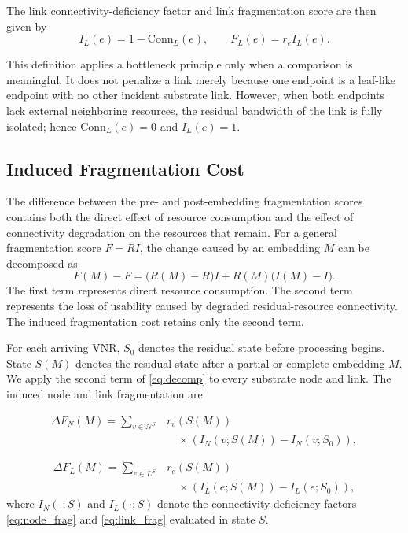 \documentclass{ieeeaccess}
\begin{document}
The link connectivity-deficiency factor and link fragmentation score are then given by
\begin{equation}
	I_L(e)=1-\mathrm{Conn}_L(e),
	\qquad
	F_L(e)=r_e I_L(e).
	\label{eq:link_frag}
\end{equation}

This definition applies a bottleneck principle only when a comparison is
meaningful. It does not penalize a link merely because one endpoint is a
leaf-like endpoint with no other incident substrate link. However, when
both endpoints lack external neighboring resources, the residual bandwidth
of the link is fully isolated; hence $\mathrm{Conn}_L(e)=0$ and
$I_L(e)=1$.

\subsection{Induced Fragmentation Cost}

The difference between the pre- and post-embedding fragmentation scores
contains both the direct effect of resource consumption and the effect of
connectivity degradation on the resources that remain. For a general
fragmentation score $F=RI$, the change caused by an embedding $M$ can be
decomposed as
\begin{equation}
	F(M)-F
	=
	\bigl(R(M)-R\bigr)I
	+
	R(M)\bigl(I(M)-I\bigr).
	\label{eq:decomp}
\end{equation}
The first term represents direct resource consumption. The second term represents the loss of
usability caused by degraded residual-resource connectivity. The induced fragmentation cost retains
only the second term.

For each arriving VNR, $S_0$ denotes the residual state before processing begins. State $S(M)$
denotes the residual state after a partial or complete embedding $M$. We apply the second term of
\eqref{eq:decomp} to every substrate node and link. The induced node and link fragmentation are

\begin{equation}
	\begin{aligned}
		\Delta F_N(M) = \sum_{v\in N^S} & r_v(S(M))                                             \\
		                                & \quad \times \left( I_N(v;S(M)) - I_N(v;S_0) \right), 
	\end{aligned}
	\label{eq:delta_fn}
\end{equation}

\begin{equation}
	\begin{aligned}
		\Delta F_L(M) = \sum_{e\in L^S} & r_e(S(M))                                             \\
		                                & \quad \times \left( I_L(e;S(M)) - I_L(e;S_0) \right), 
	\end{aligned}
	\label{eq:delta_fl}
\end{equation}
where $I_N(\cdot;S)$ and $I_L(\cdot;S)$ denote the connectivity-deficiency factors
\eqref{eq:node_frag} and \eqref{eq:link_frag} evaluated in state $S$.
\end{document}
